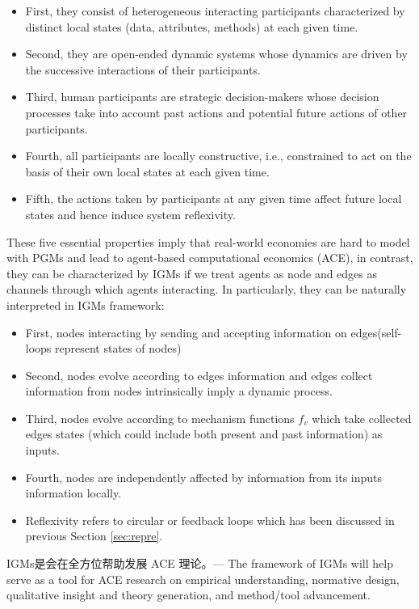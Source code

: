 \documentclass[10pt,onecolumn,letterpaper]{article}
\begin{document}
\begin{CJK*}{UTF8}{gbsn}
\begin{itemize}
    \item  First, they consist of heterogeneous interacting participants characterized by distinct local states (data, attributes, methods) at each given time. 
    \item Second, they are open-ended dynamic systems whose dynamics are driven by the successive interactions of their participants. 
    \item Third, human participants are strategic decision-makers whose decision processes take into account past actions and potential future actions of other participants. 
    \item Fourth, all participants are locally constructive, i.e., constrained to act on the basis of their own local states at each given time. 
    \item Fifth, the actions taken by participants at any given time affect future local states and hence induce system reflexivity.
\end{itemize}

These five essential properties imply that real-world economies are hard to model with PGMs and lead to agent-based computational economics (ACE)\cite{tesfatsion2006handbook, tesfatsion2002agent}, in contrast, they can be characterized by IGMs if we treat agents as node and edges as channels through which agents interacting. In particularly, they can be naturally interpreted in IGMs framework:

\begin{itemize}
    \item First, nodes interacting by sending and accepting information on edges(self-loops represent states of nodes)
    \item Second, nodes evolve according to edges information and edges collect information from nodes intrinsically imply a dynamic process.
    \item Third, nodes evolve according to mechanism functions $f_v$ which take collected edges states (which could include both present and past information) as inputs.
    \item Fourth, nodes are independently affected by information from its inputs information locally.
    \item Reflexivity refers to circular or feedback loops which has been discussed in previous Section \ref{sec:repre}.
\end{itemize} 


IGMs是会在全方位帮助发展 ACE 理论。---
The framework of IGMs will help serve as a tool for ACE research on empirical understanding, normative design, qualitative insight and theory generation, and method/tool advancement. 


\end{CJK*}
\end{document}
